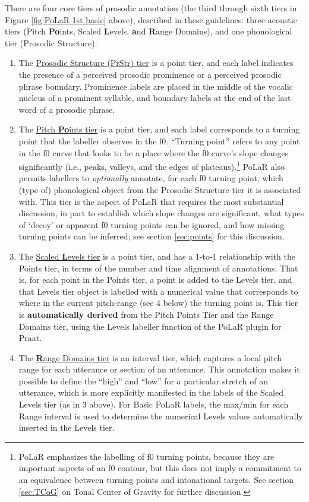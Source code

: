 \documentclass[11pt, twoside]{memoir}
\begin{document}
There are four core tiers of prosodic annotation (the third through sixth tiers in Figure \ref{fig:PoLaR 1st basic} above), described in these guidelines: three acoustic tiers (Pitch \textbf{Po}ints, Scaled \textbf{L}evels, \textbf{a}nd \textbf{R}ange Domains), and one phonological tier (Prosodic Structure).

\begin{enumerate} \def\labelenumi{\arabic{enumi}.}
\item The \uline{Prosodic Structure (PrStr) tier} is a point tier, and each label indicates the presence of a perceived prosodic prominence or a perceived prosodic phrase boundary. Prominence labels are placed in the middle of the vocalic nucleus of a prominent syllable, and boundary labels at the end of the last word of a prosodic phrase.
\item The \uline{Pitch \textbf{Po}ints tier} is a point tier, and each label corresponds to a turning point that the labeller observes in the f0. “Turning point” refers to any point in the f0 curve that looks to be a place where the f0 curve’s slope changes significantly (i.e., peaks, valleys, and the edges of plateaus).\footnote{PoLaR emphasizes the labelling of f0 turning points, because they are important aspects of an f0 contour, but this does not imply a commitment to an equivalence between turning points and intonational targets. See section \ref{sec:TCoG} on Tonal Center of Gravity for further discussion.} PoLaR also permits labellers to \textit{optionally} annotate, for each f0 turning point, which (type of) phonological object from the Prosodic Structure tier it is associated with. This tier is the aspect of PoLaR that requires the most substantial discussion, in part to establish which slope changes are significant, what types of ‘decoy’ or apparent f0 turning points can be ignored, and how missing turning points can be inferred; see section \ref{sec:points} for this discussion.
\item The \uline{Scaled \textbf{L}evels tier} is a point tier, and has a 1-to-1 relationship with the Points tier, in terms of the number and time alignment of annotations. That is, for each point in the Points tier, a point is added to the Levels tier, and that Levels tier object is labelled with a numerical value that corresponds to where in the current pitch-range (see 4 below) the turning point is. This tier is \textbf{automatically derived} from the Pitch Points Tier and the Range Domains tier, using the Levels labeller function of the PoLaR plugin for Praat.
\item The \uline{\textbf{R}ange Domains tier} is an interval tier, which captures a local pitch range for each utterance or section of an utterance. This annotation makes it possible to define the “high” and “low” for a particular stretch of an utterance, which is more explicitly manifested in the labels of the Scaled Levels tier (as in 3 above). For Basic PoLaR labels, the max\slash min for each Range interval is used to determine the numerical Levels values automatically inserted in the Levels tier. \end{enumerate}
\end{document}
